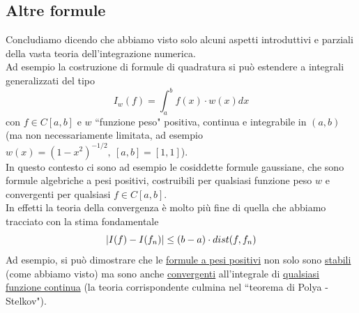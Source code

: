 \subsection{Altre formule}
Concludiamo dicendo che abbiamo visto solo alcuni aspetti introduttivi e parziali della vasta teoria dell'integrazione numerica.\\
Ad esempio la costruzione di formule di quadratura si può estendere a integrali generalizzati del tipo
\[
I_w (f) = \int_a^b f(x) \cdot w(x) dx
\]
con $f \in C[a,b]$ e $w$ ``funzione peso" positiva, continua e integrabile in $(a,b)$ (ma non necessariamente limitata, ad esempio $w(x) = (1-x^2)^{-1/2}, \ [a,b] = [1,1]$).\\
In questo contesto ci sono ad esempio le cosiddette formule gaussiane, che sono formule algebriche a pesi positivi, costruibili per qualsiasi funzione peso $w$ e convergenti per qualsiasi $f \in C [a,b]$.\\
In effetti la teoria della convergenza è molto più fine di quella che abbiamo tracciato con la stima fondamentale
\[
\lvert I(f) - I(f_n)\rvert \le (b-a) \cdot dist(f, f_n)
\]
Ad esempio, si può dimostrare che le \uline{formule a pesi positivi} non solo sono \uline{stabili} (come
abbiamo visto) ma sono anche \uline{convergenti} all'integrale di \uline{qualsiasi funzione continua} (la teoria corrispondente culmina nel ``teorema di Polya - Stelkov").
\newpage